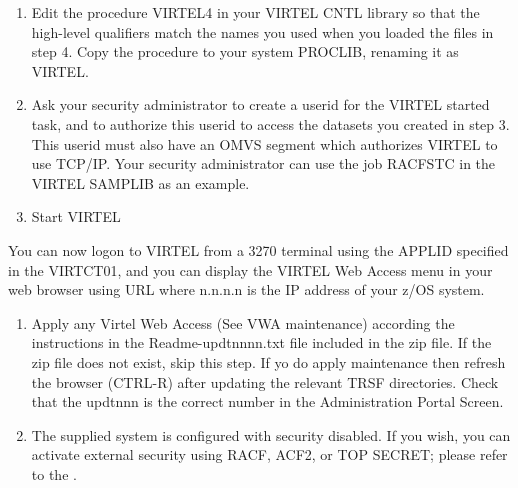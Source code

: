 \documentclass[letterpaper,10pt,english]{sphinxmanual}
\begin{document}
\begin{sphinxVerbatim}[commandchars=\\\{\}]
 
\end{sphinxVerbatim}
\begin{enumerate}
%
\setcounter{enumi}{11}
\item {} 
Edit the procedure VIRTEL4 in your VIRTEL CNTL library so that the high-level qualifiers match the names you used when you loaded the files in step 4. Copy the procedure to your system PROCLIB, renaming it as VIRTEL.

\item {} 
Ask your security administrator to create a userid for the VIRTEL started task, and to authorize this userid to access the datasets you created in step 3. This userid must also have an OMVS segment which authorizes VIRTEL to use TCP/IP. Your security administrator can use the job RACFSTC in the VIRTEL SAMPLIB as an example.

\item {} 
Start VIRTEL

\end{enumerate}

You can now logon to VIRTEL from a 3270 terminal using the APPLID specified in the VIRTCT01, and you can display the VIRTEL Web Access menu in your web browser using URL  where n.n.n.n is the IP address of your z/OS system.
\begin{enumerate}
%
\setcounter{enumi}{14}
\item {} 
Apply any Virtel Web Access (See VWA maintenance) according the instructions in the Readme-updtnnnn.txt file included in the zip file. If the zip file does not exist, skip this step. If yo do apply maintenance then refresh the browser (CTRL-R) after updating the relevant TRSF directories. Check that the updtnnn is the correct number in the Administration Portal Screen.

\item {} 
The supplied system is configured with security disabled. If you wish, you can activate external security using RACF, ACF2, or TOP SECRET; please refer to the {\hyperref[\detokenize{Installation_Guide:vvrrig-security}]{}}.

\end{enumerate}
\end{document}
